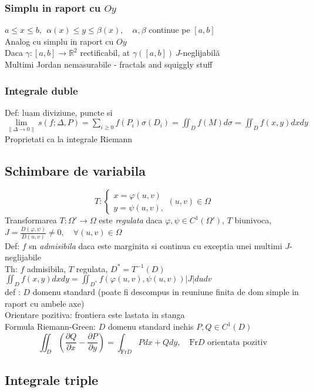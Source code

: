 \documentclass{article}
\newcommand{\parti}[2]{\frac{\partial #1}{ \partial #2}}
\newcommand*{\R}{\mathbb{R}}
\begin{document}
\subsubsection*{Simplu in raport cu $Oy$}
$ a\le x \le b,\ \ \alpha(x)\le y \le \beta(x), \quad \alpha, \beta $ continue pe $[a, b]$ \\
Analog cu simplu in raport cu $Oy$\\
Daca $\gamma: [a, b] \to \R^2$ rectificabil, at $\gamma([a, b])\ J$-neglijabilă\\
Multimi Jordan nemasurabile - fractals and squiggly stuff
\subsubsection*{Integrale duble}
Def: luam diviziune, puncte si $\displaystyle \lim\limits_{\|\Delta\to 0\|}s(f;\Delta, P) = \sum_{i\ge 0} f(P_i)\sigma(D_i)=\iint_Df(M)d\sigma=\iint_Df(x,y)dxdy$\\
Proprietati ca la integrale Riemann
\subsection*{Schimbare de variabila}
\[
  T: \begin{cases}
    x = \varphi(u, v)\\
    y = \psi(u, v),
  \end{cases}
   (u, v) \in \Omega
\]
Transformarea $T:\Omega'\to\Omega$ este \emph{regulata} daca $\varphi, \psi \in C^1(\Omega')$, $T$ biunivoca, $J = \frac{D(\varphi, \psi)}{D(u, v)} \neq 0, \quad
\forall (u, v) \in \Omega$\\
Def: $f$ sn \emph{admisibila} daca este marginita si continua cu exceptia unei multimi $J$-neglijabile\\
Th: $f$ admisibila, $T$ regulata, $D^* = T^{-1}(D)$\quad $\displaystyle \iint_D f(x, y) dxdy = \iint_{D^*} f(\varphi(u, v), \psi(u, v))|J| du dv $\\
def : $D$ domenu standard (poate fi descompus in reuniune finita de dom simple in raport cu ambele axe)\\
Orientare pozitiva: frontiera este lastata in stanga\\ 
Formula Riemann-Green: $D$ domenu standard inchis $P, Q \in C^1(D)$
\[\iint_D \left( \parti{Q}{x} - \parti{P}{y} \right) = \int_{\mathrm{Fr}D} Pdx+Qdy, \quad \mathrm{Fr}D \text{  orientata pozitiv} \]
\subsection*{Integrale triple}
\end{document}
